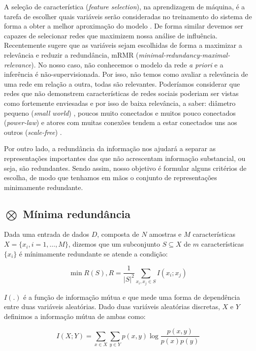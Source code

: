 A seleção de característica (\emph{feature selection}), na aprendizagem de
máquina, é a tarefa de escolher quais variáveis serão consideradas no treinamento
do sistema de forma a obter a melhor aproximação do modelo \citep{Jain1997,
Blum1997, Jain2000}. De forma similar devemos ser capazes de selecionar redes que
maximizem nossa análise de influência. Recentemente \citet{Peng2005} sugere que
as variáveis sejam escolhidas de forma a maximizar a relevância e reduzir a
redundância, mRMR (\emph{minimal-redundancy-maximal-relevance}). No nosso caso,
não conhecemos o modelo da rede \emph{a priori} e a inferência é
não-supervisionada. Por isso, não temos como avaliar a relevância de uma rede em
relação a outra, todas são relevantes. Poderíamos considerar que redes que não
demonstrem características de redes sociais poderiam ser vistas como fortemente
enviesadas e por isso de baixa relevância, a saber: diâmetro pequeno (\emph{small
world}) \citep{Milgram1967, Watts1998}, poucos muito conectados e muitos pouco
conectados (\emph{power-law}) \citep{Liljeros2001, Mitzenmacher2004} e atores com
muitas conexões tendem a estar conectados uns aos outros (\emph{scale-free})
\citep{Li2005}.

Por outro lado, a redundância da informação nos ajudará a separar as
representações importantes das que não acrescentam informação substancial, ou
seja, são redundantes. Sendo assim, nosso objetivo é formular alguns critérios
de escolha, de modo que tenhamos em mãos o conjunto de representações
minimamente redundante.

\subsection{$\bigotimes$ Mínima redundância}

Dada uma entrada de dados $D$, composta de $N$ amostras e $M$
características $X=\{x_i, i=1,\ldots,M\}$, dizemos que um subconjunto $S
\subseteq X$ de $m$ características $\{x_i\}$ é mínimamente redundante se atende
a condição:

\begin{equation}
\label{def:min_redun}
\min R(S), R = \frac{1}{|S|^2}\sum_{x_i, x_j \in S}I(x_i;x_j)
\end{equation}

$I(.)$ é a função de informação mútua e que mede uma forma de dependência entre
duas variáveis aleatórias. Dado duas variáveis aleatórias discretas, $X$ e $Y$
definimos a informação mútua de ambas como:

\begin{equation}
\label{def:inf_mutua}
I(X;Y) = \sum_{x\in X}\sum_{y\in Y}p(x,y)\log \frac{p(x,y)}{p(x)p(y)}
\end{equation}

